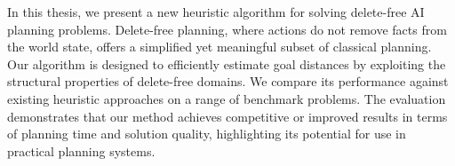 In this thesis, we present a new heuristic algorithm for solving delete-free AI planning problems.
Delete-free planning, where actions do not remove facts from the world state, offers a simplified yet
meaningful subset of classical planning. Our algorithm is designed to efficiently estimate goal distances
by exploiting the structural properties of delete-free domains. We compare its performance against
existing heuristic approaches on a range of benchmark problems. The evaluation demonstrates that our
method achieves competitive or improved results in terms of planning time and solution quality,
highlighting its potential for use in practical planning systems.
